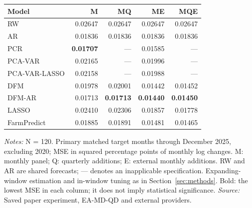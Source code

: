 \begin{threeparttable}
\begin{tabular}{lrrrr}
\toprule
Model & M & MQ & ME & MQE \\
\midrule
RW & 0.02647 & 0.02647 & 0.02647 & 0.02647 \\
AR & 0.01836 & 0.01836 & 0.01836 & 0.01836 \\
PCR & \textbf{0.01707} & --- & 0.01585 & --- \\
PCA-VAR & 0.02165 & --- & 0.01996 & --- \\
PCA-VAR-LASSO & 0.02158 & --- & 0.01988 & --- \\
DFM & 0.01978 & 0.02001 & 0.01442 & 0.01452 \\
DFM-AR & 0.01713 & \textbf{0.01713} & \textbf{0.01440} & \textbf{0.01450} \\
LASSO & 0.02410 & 0.02306 & 0.01857 & 0.01778 \\
FarmPredict & 0.01885 & 0.01891 & 0.01481 & 0.01465 \\
\bottomrule
\end{tabular}
\begin{tablenotes}[flushleft]\footnotesize
\item \textit{Notes:} N = 120. Primary matched target months through December 2025, excluding 2020; MSE in squared percentage points of monthly log changes. M: monthly panel; Q: quarterly additions; E: external monthly additions. RW and AR are shared forecasts; --- denotes an inapplicable specification. Expanding-window estimation and in-window tuning as in Section~\ref{sec:methods}. Bold: the lowest MSE in each column; it does not imply statistical significance. \textit{Source:} Saved paper experiment, EA-MD-QD and external providers.
\end{tablenotes}
\end{threeparttable}
